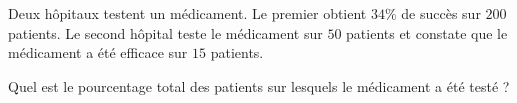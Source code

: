 
\begin{exercice}\label{exosmath-0957}

    Deux hôpitaux testent un médicament. Le premier obtient \( 34\%\) de succès sur \( 200\) patients. Le second hôpital teste le médicament sur \( 50\) patients et constate que le médicament a été efficace sur \( 15\) patients.

    Quel est le pourcentage total des patients sur lesquels le médicament a été testé ?

\end{exercice}
